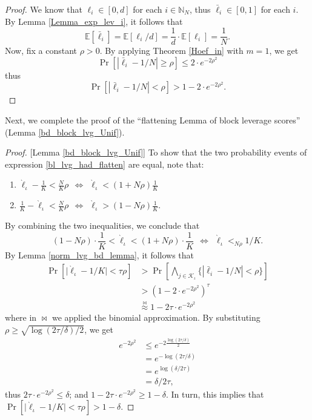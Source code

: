 \documentclass[journal,letterpaper,onecolumn,twoside,nofonttune]{IEEEtran}
\newcommand{\K}{\mathcal{K}}
\newcommand{\ellb}{\bar{\ell}}
\newcommand{\ellg}{\grave{\ell}}
\newcommand{\E}{\mathbb{E}}
\newcommand{\N}{\mathbb{N}}
\begin{document}
\begin{proof}
We know that $\ell_i\in[0,d]$ for each $i\in\N_N$, thus $\ellb_i\in[0,1]$ for each $i$. By Lemma \ref{Lemma_exp_lev_i}, it follows that
$$ \E[\ellb_i]=\E[\ell_i/d]=\frac{1}{d}\cdot\E[\ell_i]=\frac{1}{N}. $$
Now, fix a constant $\rho>0$. By applying Theorem \ref{Hoef_in} with $m=1$, we get
\begin{equation*}
\label{norm_lvg_bd}
  \Pr\left[|\ellb_i-1/N|\geqslant\rho\right] \leqslant 2\cdot e^{-2\rho^2}
\end{equation*}
thus
\begin{equation*}
  \Pr\left[|\ellb_i-1/N|<\rho\right] > 1-2\cdot e^{-2\rho^2}.
\end{equation*}
\end{proof}

Next, we complete the proof of the ``flattening Lemma of block leverage scores'' (Lemma \ref{bd_block_lvg_Unif}).

\begin{proof}{[Lemma \ref{bd_block_lvg_Unif}]}
To show that the two probability events of expression \eqref{bl_lvg_had_flatten} are equal, note that:
\begin{enumerate}
  \item $\ellg_\iota-\frac{1}{K}<\frac{N}{K}\rho \ \ \iff \ \ \ellg_\iota<(1+N\rho)\frac{1}{K}$
  \item $\frac{1}{K}-\ellg_\iota<\frac{N}{K}\rho \ \ \iff \ \ \ellg_\iota>(1-N\rho)\frac{1}{K}$.
\end{enumerate}
By combining the two inequalities, we conclude that
\begin{equation}
\label{approx_unif_error}
  (1-N\rho)\cdot\frac{1}{K} < \ellg_\iota < (1+N\rho)\cdot\frac{1}{K} \ \ \iff \ \ \ellg_\iota<_{N\rho} 1/K.
\end{equation}
By Lemma \ref{norm_lvg_bd_lemma}, it follows that
\begin{align*}
  \Pr\left[\big|\ellg_\iota-1/K\big|<\tau\rho\right] &> \Pr\left[\bigwedge_{j\in\K_\iota}\big\{|\ellb_i-1/N|<\rho\big\}\right]\\
  &> \left(1-2\cdot e^{-2\rho^2}\right)^\tau\\
  &\overset{\Join}{\approx} 1-2\tau\cdot e^{-2\rho^2}
\end{align*}
where in $\Join$ we applied the binomial approximation. By substituting $\rho\geqslant\sqrt{\log(2\tau/\delta)/2}$, we get
\begin{align*}
  e^{-2\rho^2} &\leqslant e^{-2\frac{\log(2\tau/\delta)}{2}}\\
  &= e^{-\log(2\tau/\delta)}\\
  &= e^{\log(\delta/2\tau)}\\
  &= \delta/2\tau,
\end{align*}
thus $2\tau\cdot e^{-2\rho^2}\leqslant\delta$; and $1-2\tau\cdot e^{-2\rho^2} \geqslant 1-\delta$. In turn, this implies that $\Pr\left[\big|\ellg_\iota-1/K\big|<\tau\rho\right]>1- \delta$.
\end{proof}
\end{document}
